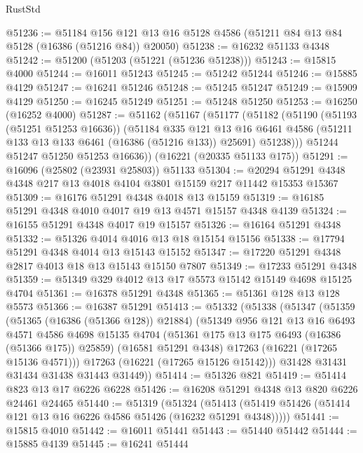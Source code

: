 \begin{lexlean}{RustStd}
\begin{coremodule}
@51236 := @51184
    @156
    @121
    @13
    @16
    @5128
    @4586
    (@51211 @84 @13 @84 @5128 (@16386 (@51216 @84)) @20050)
@51238 := @16232 @51133 @4348
@51242 := @51200 (@51203 (@51221 (@51236 @51238)))
@51243 := @15815 @4000
@51244 := @16011 @51243
@51245 := @51242 @51244
@51246 := @15885 @4129
@51247 := @16241 @51246
@51248 := @51245 @51247
@51249 := @15909 @4129
@51250 := @16245 @51249
@51251 := @51248 @51250
@51253 := @16250 (@16252 @4000)
@51287 := @51162
    (@51167
      (@51177
        (@51182
          (@51190
            (@51193 (@51251 @51253 @16636))
            (@51184
              @335
              @121
              @13
              @16
              @6461
              @4586
              (@51211 @133 @13 @133 @6461 (@16386 (@51216 @133)) @25691)
              @51238)))
        @51244
        @51247
        @51250
        @51253
        @16636))
    (@16221 (@20335 @51133 @175))
@51291 := @16096 (@25802 (@23931 @25803)) @51133
@51304 := @20294 @51291 @4348 @4348 @217 @13 @4018 @4104 @3801 @15159 @217 @11442 @15353 @15367
@51309 := @16176 @51291 @4348 @4018 @13 @15159
@51319 := @16185 @51291 @4348 @4010 @4017 @19 @13 @4571 @15157 @4348 @4139
@51324 := @16155 @51291 @4348 @4017 @19 @15157
@51326 := @16164 @51291 @4348
@51332 := @51326 @4014 @4016 @13 @18 @15154 @15156
@51338 := @17794 @51291 @4348 @4014 @13 @15143 @15152
@51347 := @17220 @51291 @4348 @2817 @4013 @18 @13 @15143 @15150 @7807
@51349 := @17233 @51291 @4348
@51359 := @51349 @329 @4012 @13 @17 @5573 @15142 @15149 @4698 @15125 @4704
@51361 := @16378 @51291 @4348
@51365 := @51361 @128 @13 @128 @5573
@51366 := @16387 @51291
@51413 := @51332
    (@51338
      (@51347
        (@51359
          (@51365 (@16386 (@51366 @128)) @21884)
          (@51349
            @956
            @121
            @13
            @16
            @6493
            @4571
            @4586
            @4698
            @15135
            @4704
            (@51361 @175 @13 @175 @6493 (@16386 (@51366 @175)) @25859)
            (@16581 @51291 @4348)
            @17263
            (@16221 (@17265 @15136 @4571)))
          @17263
          (@16221 (@17265 @15126 @15142)))
        @31428
        @31431
        @31434
        @31438
        @31443
        @31449))
@51414 := @51326 @821
@51419 := @51414 @823 @13 @17 @6226 @6228
@51426 := @16208 @51291 @4348 @13 @820 @6226 @24461 @24465
@51440 := @51319
    (@51324 (@51413 (@51419 @51426 (@51414 @121 @13 @16 @6226 @4586 @51426 (@16232 @51291 @4348)))))
@51441 := @15815 @4010
@51442 := @16011 @51441
@51443 := @51440 @51442
@51444 := @15885 @4139
@51445 := @16241 @51444

\end{coremodule}
\end{lexlean}
